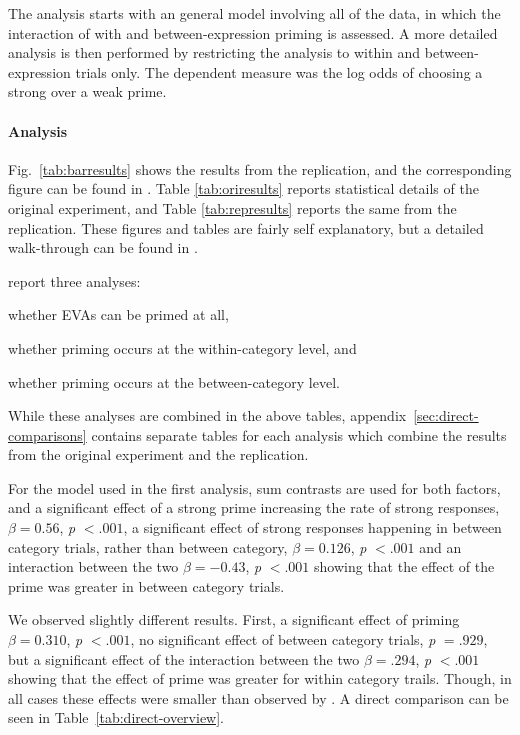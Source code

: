 \documentclass[10pt]{article}
\begin{document}
\begin{multicols}{2}
The analysis starts with an general model involving all of the data, in which the interaction of with and between-expression priming is assessed.
A more detailed analysis is then performed by restricting the analysis to within and between-expression trials only.
The dependent measure was the log odds of choosing a strong over a weak prime.

\paragraph{Analysis}

Fig.\ \ref{tab:barresults} shows the results from the replication, and the corresponding figure can be found in \textcite[122]{Bott:2016aa}.
Table \ref{tab:oriresults} reports statistical details of the original experiment, and Table \ref{tab:represults} reports the same from the replication.
These figures and tables are fairly self explanatory, but a detailed walk-through can be found in \textcite[125]{Bott:2016aa}.

\citeauthor{Bott:2016aa} report three analyses:
\begin{enumerate*}
\item whether EVAs can be primed at all,
\item whether priming occurs at the within-category level, and
\item whether priming occurs at the between-category level.
\end{enumerate*}
While these analyses are combined in the above tables, appendix~\ref{sec:direct-comparisons} contains separate tables for each analysis which combine the results from the original experiment and the replication.

For the model used in the first analysis, sum contrasts are used for both factors, and a significant effect of a strong prime increasing the rate of strong responses, \(\beta = 0.56\), \emph{p} \(< .001\), a significant effect of strong responses happening in between category trials, rather than between category, \(\beta = 0.126\), \emph{p} \(< .001\) and an interaction between the two \(\beta = -0.43\), \emph{p} \(< .001\) showing that the effect of the prime was greater in between category trials.

We observed slightly different results.
First, a significant effect of priming \(\beta = 0.310\), \emph{p} \(<.001\), no significant effect of between category trials, \emph{p} \(= .929\), but a significant effect of the interaction between the two \(\beta = .294\), \emph{p} \(<.001\) showing that the effect of prime was greater for within category trails.
Though, in all cases these effects were smaller than observed by \citeauthor{Bott:2016aa}.
A direct comparison can be seen in Table~\ref{tab:direct-overview}.


\end{multicols}
\end{document}
